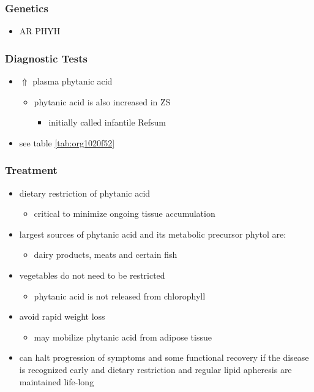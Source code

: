 \documentclass[12pt]{scrartcl}
\begin{document}
\subsubsection{Genetics}
\label{sec:orgba94ea6}
\begin{itemize}
\item AR PHYH
\end{itemize}

\subsubsection{Diagnostic Tests}
\label{sec:org5a7ca78}
\begin{itemize}
\item \(\Uparrow\) plasma phytanic acid 
\begin{itemize}
\item phytanic acid is also increased in ZS
\begin{itemize}
\item initially called infantile Refsum
\end{itemize}
\end{itemize}
\item see table \ref{tab:org1020f52}
\end{itemize}
\subsubsection{Treatment}
\label{sec:org71e980d}
\begin{itemize}
\item dietary restriction of phytanic acid 
\begin{itemize}
\item critical to minimize ongoing tissue accumulation
\end{itemize}
\item largest sources of phytanic acid and its metabolic precursor phytol are:
\begin{itemize}
\item dairy products, meats and certain fish
\end{itemize}
\item vegetables do not need to be restricted
\begin{itemize}
\item phytanic acid is not released from chlorophyll
\end{itemize}
\item avoid rapid weight loss
\begin{itemize}
\item may mobilize phytanic acid from adipose tissue
\end{itemize}
\item can halt progression of symptoms and some functional recovery if the
disease is recognized early and dietary restriction and regular
lipid apheresis are maintained life-long
\end{itemize}
\end{document}
